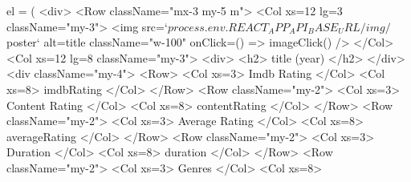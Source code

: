 {{            el = (
                <div>
                    <Row className="mx-3 my-5 m">
                        <Col xs={12} lg={3} className="my-3">
                            <img
                                src={`${process.env.REACT_APP_API_BASE_URL}/img/${poster}`}
                                alt={title}
                                className="w-100"
                                onClick={() => imageClick()}
                            />
                        </Col>
                        <Col xs={12} lg={8} className="my-3">
                            <div>
                                <h2>
                                    {title} ({year})
                                </h2>
                            </div>
                            <div className="my-4">
                                <Row>
                                    <Col xs={3}>
                                        Imdb Rating
                                    </Col>
                                    <Col xs={8}>
                                        {imdbRating}
                                    </Col>
                                </Row>
                                <Row className="my-2">
                                    <Col xs={3}>
                                        Content Rating
                                    </Col>
                                    <Col xs={8}>
                                        {contentRating}
                                    </Col>
                                </Row>
                                <Row className="my-2">
                                    <Col xs={3}>
                                        Average Rating
                                    </Col>
                                    <Col xs={8}>
                                        {averageRating}
                                    </Col>
                                </Row>
                                <Row className="my-2">
                                    <Col xs={3}>
                                        Duration
                                    </Col>
                                    <Col xs={8}>
                                        {duration}
                                    </Col>
                                </Row>
                                <Row className="my-2">
                                    <Col xs={3}>
                                        Genres
                                    </Col>
                                    <Col xs={8}>
                                        {
}}}
